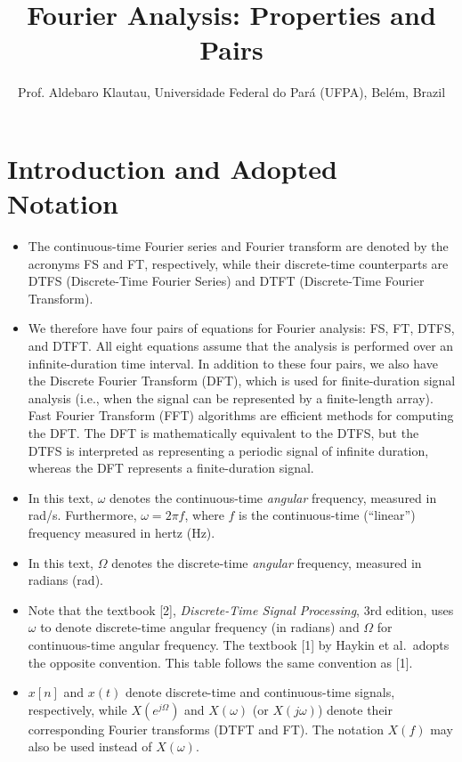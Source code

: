 \documentclass{article}
\title{Fourier Analysis: Properties and Pairs}
\author{Prof. Aldebaro Klautau, Universidade Federal do Pará (UFPA), Belém, Brazil}
\newcommand{\dw}{\Omega} %
\newcommand{\aw}{\omega} %
\newcommand{\adoptedbook}{1} %
\begin{document}
\maketitle

\section{Introduction and Adopted Notation}
\begin{itemize}

\item The continuous-time Fourier series and Fourier transform are denoted by the acronyms FS and FT, respectively, while their discrete-time counterparts are DTFS (Discrete-Time Fourier Series) and DTFT (Discrete-Time Fourier Transform).

\item We therefore have four pairs of equations for Fourier analysis: FS, FT, DTFS, and DTFT. All eight equations assume that the analysis is performed over an infinite-duration time interval. In addition to these four pairs, we also have the Discrete Fourier Transform (DFT), which is used for finite-duration signal analysis (i.e., when the signal can be represented by a finite-length array). Fast Fourier Transform (FFT) algorithms are efficient methods for computing the DFT. The DFT is mathematically equivalent to the DTFS, but the DTFS is interpreted as representing a periodic signal of infinite duration, whereas the DFT represents a finite-duration signal.

\item In this text, $\aw$ denotes the continuous-time \emph{angular} frequency, measured in rad/s. Furthermore, $\aw = 2 \pi f$, where $f$ is the continuous-time (``linear'') frequency measured in hertz (Hz).

\item In this text, $\dw$ denotes the discrete-time \emph{angular} frequency, measured in radians (rad).

\item Note that the textbook [2], \emph{Discrete-Time Signal Processing}, 3rd edition, uses $\omega$ to denote discrete-time angular frequency (in radians) and $\Omega$ for continuous-time angular frequency. The textbook [1] by Haykin et al.\ adopts the opposite convention. This table follows the same convention as [\adoptedbook].

\item $x[n]$ and $x(t)$ denote discrete-time and continuous-time signals, respectively, while $X(e^{j\dw})$ and $X(\aw)$ (or $X(j\aw)$) denote their corresponding Fourier transforms (DTFT and FT). The notation $X(f)$ may also be used instead of $X(\aw)$.


\end{itemize}
\end{document}
